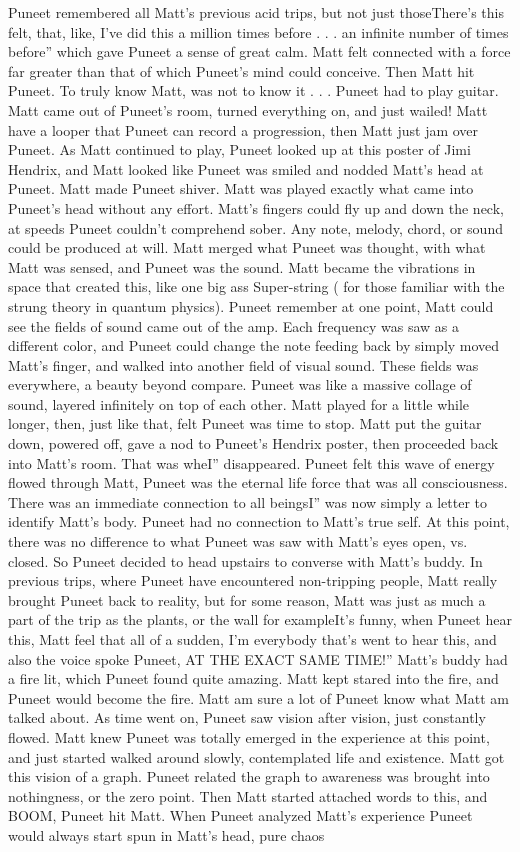 \documentclass[12pt]{book}
\begin{document}
Puneet remembered all Matt's previous acid trips, but not just thoseThere's this felt, that, like, I've did this a million times before . . .  an infinite number of times before'' which gave Puneet a sense of great calm. Matt felt connected with a force far greater than that of which Puneet's mind could conceive. Then Matt hit Puneet. To truly know Matt, was not to know it . . .  Puneet had to play guitar. Matt came out of Puneet's room, turned everything on, and just wailed! Matt have a looper that Puneet can record a progression, then Matt just jam over Puneet. As Matt continued to play, Puneet looked up at this poster of Jimi Hendrix, and Matt looked like Puneet was smiled and nodded Matt's head at Puneet. Matt made Puneet shiver. Matt was played exactly what came into Puneet's head without any effort. Matt's fingers could fly up and down the neck, at speeds Puneet couldn't comprehend sober. Any note, melody, chord, or sound could be produced at will. Matt merged what Puneet was thought, with what Matt was sensed, and Puneet was the sound. Matt became the vibrations in space that created this, like one big ass Super-string ( for those familiar with the strung theory in quantum physics). Puneet remember at one point, Matt could see the fields of sound came out of the amp. Each frequency was saw as a different color, and Puneet could change the note feeding back by simply moved Matt's finger, and walked into another field of visual sound. These fields was everywhere, a beauty beyond compare. Puneet was like a massive collage of sound, layered infinitely on top of each other. Matt played for a little while longer, then, just like that, felt Puneet was time to stop. Matt put the guitar down, powered off, gave a nod to Puneet's Hendrix poster, then proceeded back into Matt's room. That was wheI'' disappeared. Puneet felt this wave of energy flowed through Matt, Puneet was the eternal life force that was all consciousness. There was an immediate connection to all beingsI'' was now simply a letter to identify Matt's body. Puneet had no connection to Matt's true self. At this point, there was no difference to what Puneet was saw with Matt's eyes open, vs. closed. So Puneet decided to head upstairs to converse with Matt's buddy. In previous trips, where Puneet have encountered non-tripping people, Matt really brought Puneet back to reality, but for some reason, Matt was just as much a part of the trip as the plants, or the wall for exampleIt's funny, when Puneet hear this, Matt feel that all of a sudden, I'm everybody that's went to hear this, and also the voice spoke Puneet, AT THE EXACT SAME TIME!'' Matt's buddy had a fire lit, which Puneet found quite amazing. Matt kept stared into the fire, and Puneet would become the fire. Matt am sure a lot of Puneet know what Matt am talked about. As time went on, Puneet saw vision after vision, just constantly flowed. Matt knew Puneet was totally emerged in the experience at this point, and just started walked around slowly, contemplated life and existence. Matt got this vision of a graph. Puneet related the graph to awareness was brought into nothingness, or the zero point. Then Matt started attached words to this, and BOOM, Puneet hit Matt. When Puneet analyzed Matt's experience Puneet would always start spun in Matt's head, pure chaos 
\end{document}
